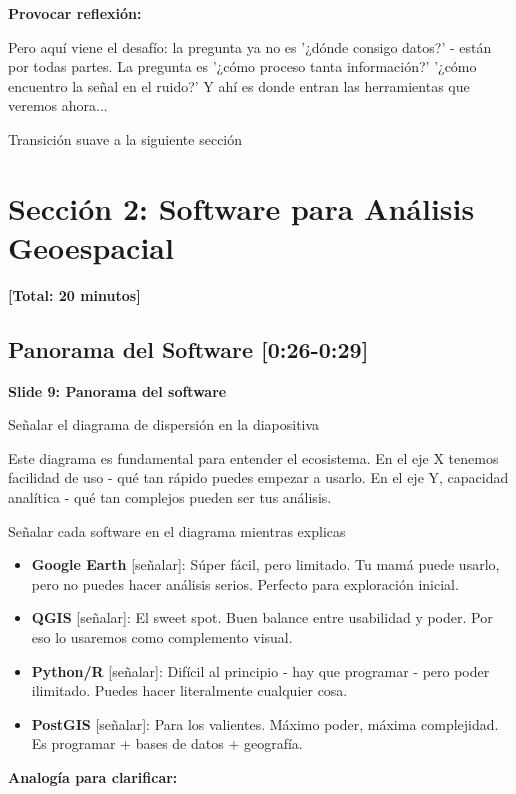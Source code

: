 \documentclass[11pt,a4paper]{article}
\newcommand{\tiempo}[1]{\textcolor{timecolor}{\faIcon{clock} \textbf{[#1]}}}
\newcommand{\decir}[1]{\begin{tcolorbox}[colback=blue!5,colframe=usachblue,title={\faIcon{microphone} DECIR}]#1\end{tcolorbox}}
\newcommand{\hacer}[1]{\begin{tcolorbox}[colback=green!5,colframe=green!50!black,title={\faIcon{hand-point-right} HACER}]#1\end{tcolorbox}}
\begin{document}
\textbf{Provocar reflexión:}

\decir{Pero aquí viene el desafío: la pregunta ya no es '¿dónde consigo datos?' - están por todas partes. La pregunta es '¿cómo proceso tanta información?' '¿cómo encuentro la señal en el ruido?' Y ahí es donde entran las herramientas que veremos ahora...}

\hacer{Transición suave a la siguiente sección}

\newpage

\section{Sección 2: Software para Análisis Geoespacial}

\tiempo{Total: 20 minutos}

\subsection{Panorama del Software \tiempo{0:26-0:29}}

\textbf{Slide 9: Panorama del software}

\hacer{Señalar el diagrama de dispersión en la diapositiva}

\decir{Este diagrama es fundamental para entender el ecosistema. En el eje X tenemos facilidad de uso - qué tan rápido puedes empezar a usarlo. En el eje Y, capacidad analítica - qué tan complejos pueden ser tus análisis.}

\hacer{Señalar cada software en el diagrama mientras explicas}

\decir{
\begin{itemize}
    \item \textbf{Google Earth} [señalar]: Súper fácil, pero limitado. Tu mamá puede usarlo, pero no puedes hacer análisis serios. Perfecto para exploración inicial.
    \item \textbf{QGIS} [señalar]: El sweet spot. Buen balance entre usabilidad y poder. Por eso lo usaremos como complemento visual.
    \item \textbf{Python/R} [señalar]: Difícil al principio - hay que programar - pero poder ilimitado. Puedes hacer literalmente cualquier cosa.
    \item \textbf{PostGIS} [señalar]: Para los valientes. Máximo poder, máxima complejidad. Es programar + bases de datos + geografía.
\end{itemize}
}

\textbf{Analogía para clarificar:}
\end{document}
